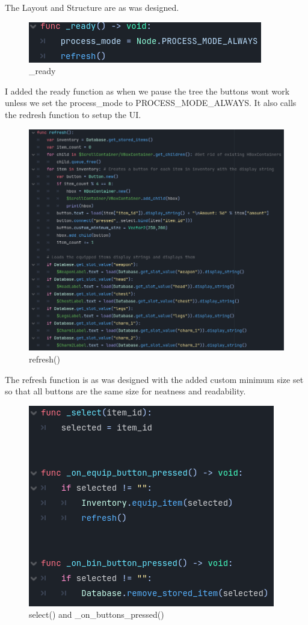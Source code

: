 \documentclass{article}
\begin{document}
        The Layout and Structure are as was designed.\\
        \begin{figure}[H]
                \centering
                \includegraphics[width = 0.8\columnwidth]{images/development/InventoryUI_ready.PNG}
                \caption{\_ready}
        \end{figure}
        I added the ready function as when we pause the tree the buttons wont work unless we set the process\_mode to PROCESS\_MODE\_ALWAYS. It also calls the redresh function to setup the UI.\\
        \begin{figure}[H]
                \centering
                \includegraphics[width = 0.8\columnwidth]{images/development/InventoryUI_refresh.PNG}
                \caption{refresh()}
        \end{figure}
        The refresh function is as was designed with the added custom minimum size set so that all buttons are the same size for neatness and readability.\\
        \begin{figure}[H]
                \centering
                \includegraphics[width = 0.8\columnwidth]{images/development/InventoryUI_select.PNG}
                \caption{select() and \_on\_buttons\_pressed()}
        \end{figure}
\end{document}
